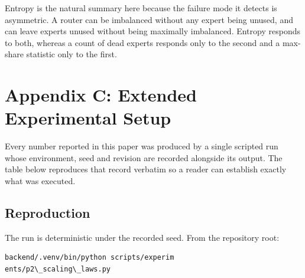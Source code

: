 \documentclass[10pt,journal,compsoc,twocolumn]{IEEEtran}
\begin{document}
Entropy is the natural summary here because the failure mode it detects is asymmetric. A router can be imbalanced without any expert being unused, and can leave experts unused without being maximally imbalanced. Entropy responds to both, whereas a count of dead experts responds only to the second and a max-share statistic only to the first.




\section{Appendix C: Extended Experimental Setup}


Every number reported in this paper was produced by a single scripted run whose environment, seed and revision are recorded alongside its output. The table below reproduces that record verbatim so a reader can establish exactly what was executed.
\begin{table}[htbp]
\centering
{}
\end{table}


\subsection{Reproduction}


The run is deterministic under the recorded seed. From the repository root:


\begin{scriptsize}
\begin{verbatim}
backend/.venv/bin/python scripts/experim
ents/p2\_scaling\_laws.py
\end{verbatim}
\end{scriptsize}
\end{document}
